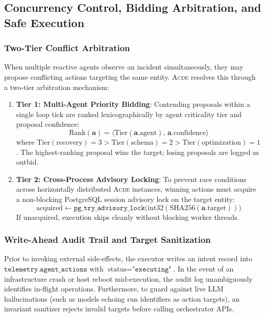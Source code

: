 \subsection{Concurrency Control, Bidding Arbitration, and Safe Execution}
\label{subsec:execution}

\subsubsection{Two-Tier Conflict Arbitration}
When multiple reactive agents observe an incident simultaneously, they may propose conflicting actions targeting the same entity. \textsc{Acde} resolves this through a two-tier arbitration mechanism:
\begin{enumerate}
    \item \textbf{Tier 1: Multi-Agent Priority Bidding}: Contending proposals within a single loop tick are ranked lexicographically by agent criticality tier and proposal confidence:
    \begin{equation}
    \text{Rank}(\mathbf{a}) = \big\langle \text{Tier}(\mathbf{a}.\text{agent}), \, \mathbf{a}.\text{confidence} \big\rangle
    \end{equation}
    where $\text{Tier}(\text{recovery}) = 3 > \text{Tier}(\text{schema}) = 2 > \text{Tier}(\text{optimization}) = 1$. The highest-ranking proposal wins the target; losing proposals are logged as outbid.
    \item \textbf{Tier 2: Cross-Process Advisory Locking}: To prevent race conditions across horizontally distributed \textsc{Acde} instances, winning actions must acquire a non-blocking PostgreSQL session advisory lock on the target entity:
    \begin{equation}
    \text{acquired} \leftarrow \texttt{pg\_try\_advisory\_lock}\big(\text{int32}(\text{SHA256}(\mathbf{a}.\text{target}))\big)
    \end{equation}
    If unacquired, execution skips cleanly without blocking worker threads.
\end{enumerate}

\subsubsection{Write-Ahead Audit Trail and Target Sanitization}
Prior to invoking external side-effects, the executor writes an intent record into $\texttt{telemetry.agent\_actions}$ with $\text{status} = \texttt{"executing"}$. In the event of an infrastructure crash or host reboot mid-execution, the audit log unambiguously identifies in-flight operations. Furthermore, to guard against live LLM hallucinations (such as models echoing run identifiers as action targets), an invariant sanitizer rejects invalid targets before calling orchestrator APIs.


